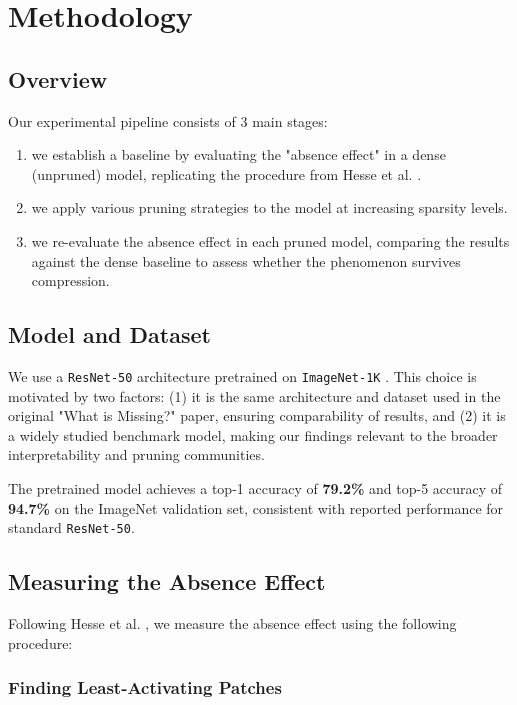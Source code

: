 \section{\textbf{Methodology}}

\subsection{\textbf{Overview}}

Our experimental pipeline consists of 3 main stages:

\begin{enumerate}
\item we establish a baseline by evaluating the "absence effect" in a dense (unpruned) model, replicating the procedure from Hesse et al. \cite{whatismissing}.
\item we apply various pruning strategies to the model at increasing sparsity levels.
\item we re-evaluate the absence effect in each pruned model, comparing the results against the dense baseline to assess whether the phenomenon survives compression.
\end{enumerate}

\subsection{\textbf{Model and Dataset}}

We use a \texttt{ResNet-50} \cite{resnet} architecture pretrained on \texttt{ImageNet-1K} \cite{imagenet}. This choice is motivated by two factors: (1) it is the same architecture and dataset used in the original "What is Missing?" paper, ensuring comparability of results, and (2) it is a widely studied benchmark model, making our findings relevant to the broader interpretability and pruning communities.

The pretrained model achieves a top-1 accuracy of \textbf{79.2\%} and top-5 accuracy of \textbf{94.7\%} on the ImageNet validation set, consistent with reported performance for standard \texttt{ResNet-50}.

\subsection{\textbf{Measuring the Absence Effect}}

Following Hesse et al. \cite{whatismissing}, we measure the absence effect using the following procedure:

\subsubsection{\textbf{Finding Least-Activating Patches}}


